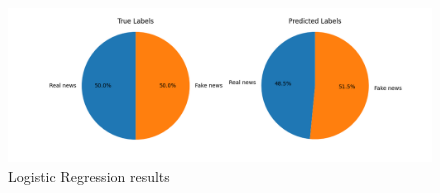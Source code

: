 \documentclass[10pt,twocolumn,letterpaper]{article}
\begin{document}
\begin{figure}[h]
   \begin{center}
        \includegraphics[scale=0.6]{graphs/LR/piechart.png}
   \end{center}
\vspace*{-5mm}
\caption{Logistic Regression results \label{piechart_1}}
\end{figure}
\end{document}
